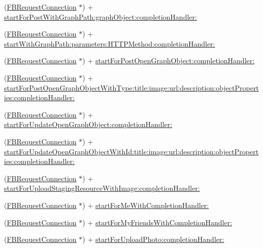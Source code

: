 \begin{DoxyCompactItemize}
\item 
(\hyperlink{interfaceFBRequestConnection}{F\+B\+Request\+Connection} $\ast$) + \hyperlink{interfaceFBRequestConnection_ac79fe3711cf5a9dd8a9dde04638ca255}{start\+For\+Post\+With\+Graph\+Path\+:graph\+Object\+:completion\+Handler\+:}
\item 
(\hyperlink{interfaceFBRequestConnection}{F\+B\+Request\+Connection} $\ast$) + \hyperlink{interfaceFBRequestConnection_aff0e9852584fcd2c81eb7f4751ef0ee2}{start\+With\+Graph\+Path\+:parameters\+:\+H\+T\+T\+P\+Method\+:completion\+Handler\+:}
\item 
(\hyperlink{interfaceFBRequestConnection}{F\+B\+Request\+Connection} $\ast$) + \hyperlink{interfaceFBRequestConnection_aa592bef80bf5a2450be91fc9538b65bd}{start\+For\+Post\+Open\+Graph\+Object\+:completion\+Handler\+:}
\item 
(\hyperlink{interfaceFBRequestConnection}{F\+B\+Request\+Connection} $\ast$) + \hyperlink{interfaceFBRequestConnection_a98c88d095d77cc16d000fb9ce51d39e1}{start\+For\+Post\+Open\+Graph\+Object\+With\+Type\+:title\+:image\+:url\+:description\+:object\+Properties\+:completion\+Handler\+:}
\item 
(\hyperlink{interfaceFBRequestConnection}{F\+B\+Request\+Connection} $\ast$) + \hyperlink{interfaceFBRequestConnection_a481c4621f12410a7f6bbc7a0ccd6890b}{start\+For\+Update\+Open\+Graph\+Object\+:completion\+Handler\+:}
\item 
(\hyperlink{interfaceFBRequestConnection}{F\+B\+Request\+Connection} $\ast$) + \hyperlink{interfaceFBRequestConnection_ab5cf9ca8b5ab176a3d46fdf8db08ddf8}{start\+For\+Update\+Open\+Graph\+Object\+With\+Id\+:title\+:image\+:url\+:description\+:object\+Properties\+:completion\+Handler\+:}
\item 
(\hyperlink{interfaceFBRequestConnection}{F\+B\+Request\+Connection} $\ast$) + \hyperlink{interfaceFBRequestConnection_a930bc2fc6bfff73c3d98d15e6c84a5f9}{start\+For\+Upload\+Staging\+Resource\+With\+Image\+:completion\+Handler\+:}
\item 
(\hyperlink{interfaceFBRequestConnection}{F\+B\+Request\+Connection} $\ast$) + \hyperlink{interfaceFBRequestConnection_a9d89090f947eacfdf441172f842f5bc8}{start\+For\+Me\+With\+Completion\+Handler\+:}
\item 
(\hyperlink{interfaceFBRequestConnection}{F\+B\+Request\+Connection} $\ast$) + \hyperlink{interfaceFBRequestConnection_a1eeb9942474312db3197be0fa569bc60}{start\+For\+My\+Friends\+With\+Completion\+Handler\+:}
\item 
(\hyperlink{interfaceFBRequestConnection}{F\+B\+Request\+Connection} $\ast$) + \hyperlink{interfaceFBRequestConnection_a824e16e083537312be6d59c8bece3f0e}{start\+For\+Upload\+Photo\+:completion\+Handler\+:}

\end{DoxyCompactItemize}
